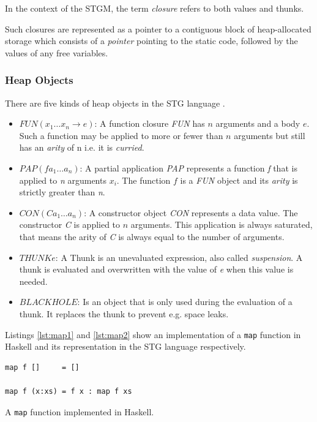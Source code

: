 \documentclass[runningheads]{llncs}
\begin{document}
In the context of the STGM, the term \textit{closure} refers to both values and thunks.

Such closures are represented as a pointer to a contiguous block of heap-allocated storage which consists of a \textit{pointer} pointing to the static code, followed by the values of any free variables.


\subsubsection{Heap Objects}

There are five kinds of heap objects in the STG language \cite{marlow2004making}.

\begin{itemize}
	\item[] $FUN(x_1 \dots x_n \rightarrow e)$: A function closure \textit{FUN} has $n$ arguments and a body $e$. Such a function may be applied to more or fewer than $n$ arguments but still has an \textit{arity} of n i.e. it is \textit{curried}.
	\item[] $PAP(f a_1 \dots a_n)$: A partial application \textit{PAP} represents a function \textit{f} that is applied to \textit{n} arguments $x_i$. The function $f$ is a \textit{FUN} object and its \textit{arity} is strictly greater than \textit{n}.
	\item[] $CON(C a_1 \dots a_n)$: A constructor object \textit{CON} represents a data value. The constructor \textit{C} is applied to $n$ arguments. This application is always saturated, that means the arity of \textit{C} is always equal to the number of arguments.
	\item[] $THUNK e$: A Thunk is an unevaluated expression, also called \textit{suspension}. A thunk is evaluated and overwritten with the value of \textit{e} when this value is needed.
	\item[] $BLACKHOLE$: Is an object that is only used during the evaluation of a thunk. It replaces the thunk to prevent e.g. space leaks.
\end{itemize}

Listings \ref{lst:map1} and \ref{lst:map2} show an implementation of a \texttt{map} function in Haskell and its representation in the STG language respectively.

\begin{listing}[H]
\begin{verbatim}
map f []     = []

map f (x:xs) = f x : map f xs
\end{verbatim}
\caption{A \texttt{map} function implemented in Haskell.}
\label{lst:map1}
\end{listing}
\end{document}
